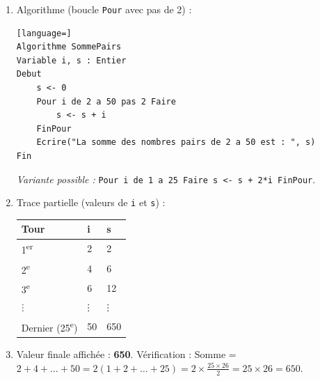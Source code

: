 \documentclass[11pt]{article}
\def\vdots{\mathord{\vbox{\baselineskip3.2pt\lineskiplimit0pt\kern4pt\hbox{.}\hbox{.}\hbox{.}}}}%
\begin{document}
\begin{corrige}
\begin{enumerate}
\item Algorithme (boucle \texttt{Pour} avec pas de 2) :
\begin{lstlisting}[language=]
Algorithme SommePairs
Variable i, s : Entier
Debut
    s <- 0
    Pour i de 2 a 50 pas 2 Faire
        s <- s + i
    FinPour
    Ecrire("La somme des nombres pairs de 2 a 50 est : ", s)
Fin
\end{lstlisting}
\emph{Variante possible :} \texttt{Pour i de 1 a 25 Faire s <- s + 2*i FinPour}.
\item Trace partielle (valeurs de \texttt{i} et \texttt{s}) :
\begin{center}
\begin{tabularx}{\linewidth}{|l|X|X|}
\hline
\rowcolor{popblueL} \textbf{Tour} & \textbf{i} & \textbf{s} \\
\hline
1\textsuperscript{er} & 2 & 2 \\
\hline
2\textsuperscript{e} & 4 & 6 \\
\hline
3\textsuperscript{e} & 6 & 12 \\
\hline
$\vdots$ & $\vdots$ & $\vdots$ \\
\hline
Dernier (25\textsuperscript{e}) & 50 & 650 \\
\hline
\end{tabularx}
\end{center}
\item Valeur finale affichée : \textbf{650}.
Vérification : Somme = $2+4+\dots+50 = 2(1+2+\dots+25) = 2 \times \frac{25 \times 26}{2} = 25 \times 26 = 650$.
\end{enumerate}
\end{corrige}
\end{document}
